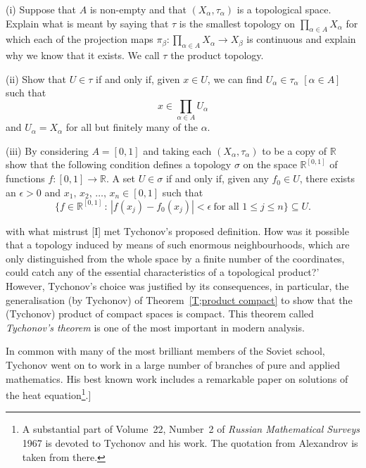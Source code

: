\begin{problem}\label{E;Infinite product}
(i) Suppose that $A$ is non-empty and that $(X_{\alpha},\tau_{\alpha})$
is a topological space. Explain what is meant by saying that
$\tau$ is the smallest topology on
$\prod_{\alpha\in A}X_{\alpha}$ for which each of the projection maps
$\pi_{\beta}:\prod_{\alpha\in A}X_{\alpha}\rightarrow X_{\beta}$
is continuous and explain why we know that it exists.
We call $\tau$ the product topology.

(ii) Show that $U\in\tau$ if and only if,
given $x\in U$,
we can find $U_{\alpha}\in\tau_{\alpha}$ $[\alpha\in A]$
such that
\[x\in\prod_{\alpha\in A}U_{\alpha}\]
and $U_{\alpha}=X_{\alpha}$ for all but finitely many of the $\alpha$.

(iii) By considering $A=[0,1]$ and taking each $(X_{\alpha},\tau_{\alpha})$
to be a copy of ${\mathbb R}$ show that the following
condition defines a topology $\sigma$
on the space ${\mathbb R}^{[0,1]}$ of functions
$f:[0,1]\rightarrow{\mathbb R}$.
A set $U\in\sigma$ if and only if, given any $f_{0}\in U$,
there exists an $\epsilon>0$
and $x_{1},\,x_{2},\,\dots,\,x_{n}\in[0,1]$ such that
\[\{f\in {\mathbb R}^{[0,1]}\,:\,
|f(x_{j})-f_{0}(x_{j})|<\epsilon
\ \text{for all $1\leq j\leq n$}\}\subseteq U.\]


\noindent[The reader who can not see the point of this topology
is in good, but mistaken, company. The great topologist
Alexandrov recalled that when Tychonov (then aged only~20)
produced this definition 'His chosen \dots definition seemed
not only unexpected but perfectly paradoxical. [I remember]
with what mistrust [I] met Tychonov's proposed definition.
How was it possible that a topology induced by means of
such enormous neighbourhoods, which are only distinguished
from the whole space by a finite number of the coordinates,
could catch any of the essential characteristics of a
topological product?' However, Tychonov's choice was justified
by its consequences, in particular, the generalisation (by Tychonov)
of Theorem~\ref{T;product compact} to show that the
(Tychonov) product of compact spaces is compact.
This theorem called \emph{Tychonov's theorem} is
one of the most important in modern analysis.

In common with many of the most brilliant members
of the Soviet school, Tychonov went on to work in
a large number of branches of pure and applied
mathematics. His best known work includes a remarkable
paper on solutions of the heat
equation\footnote{A substantial part of Volume~22, Number~2
of \emph{Russian Mathematical Surveys} 1967 is devoted
to Tychonov and his work. The quotation from Alexandrov
is taken from there.}.]
\end{problem}
